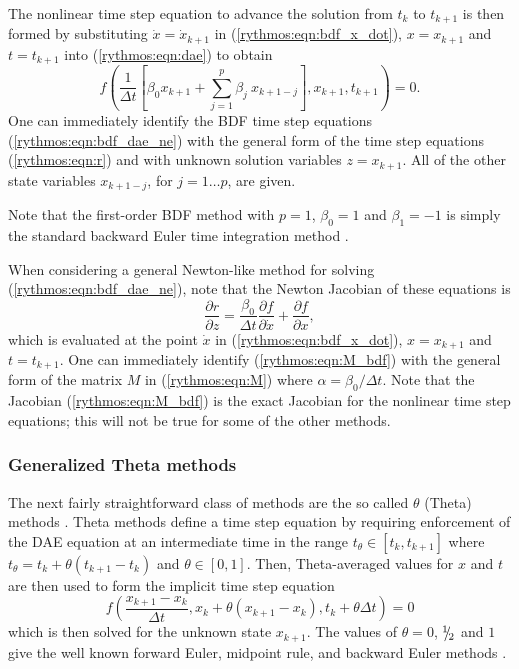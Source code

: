 \documentclass[pdf,ps2pdf,11pt]{SANDreport}
\begin{document}
The nonlinear time step equation to advance the solution from $t_k$ to
$t_{k+1}$ is then formed by substituting $\dot{x} = \dot{x}_{k+1}$ in
(\ref{rythmos:eqn:bdf_x_dot}), $x = x_{k+1}$ and $t = t_{k+1}$ into
(\ref{rythmos:eqn:dae}) to obtain
%
\begin{equation}
f\left( \frac{1}{\Delta t} \left[ \beta_0 x_{k+1} + \sum_{j=1}^{p} \beta_j \: x_{k+1-j} \right],x_{k+1},t_{k+1}\right) = 0.
\label{rythmos:eqn:bdf_dae_ne}
\end{equation}
%
One can immediately identify the BDF time step equations
(\ref{rythmos:eqn:bdf_dae_ne}) with the general form of the time step
equations (\ref{rythmos:eqn:r}) and with unknown solution variables $z =
x_{k+1}$.  All of the other state variables $x_{k+1-j}$, for $j = 1 {}\ldots
p$, are given.

Note that the first-order BDF method with $p=1$, $\beta_0 = 1$ and $\beta_1 =
-1$ is simply the standard backward Euler time integration method \cite{AscherPetzold}.

When considering a general Newton-like method for solving
(\ref{rythmos:eqn:bdf_dae_ne}), note that the Newton Jacobian of these
equations is
%
\begin{equation}
\frac{\partial r}{\partial z}
= \frac{\beta_0}{\Delta t} \frac{\partial f}{\partial \dot{x}} + \frac{\partial f}{\partial x},
\label{rythmos:eqn:M_bdf}
\end{equation}
%
which is evaluated at the point $\dot{x}$ in (\ref{rythmos:eqn:bdf_x_dot}), $x
= x_{k+1}$ and $t = t_{k+1}$.  One can immediately identify
(\ref{rythmos:eqn:M_bdf}) with the general form of the matrix $M$ in
(\ref{rythmos:eqn:M}) where $\alpha = \beta_0 / \Delta t$.  Note that the
Jacobian (\ref{rythmos:eqn:M_bdf}) is the exact Jacobian for the nonlinear
time step equations; this will not be true for some of the other methods.

\subsubsection{Generalized Theta methods}

The next fairly straightforward class of methods are the so called $\theta$
(Theta) methods \cite{HairerWanner}.  Theta methods define a time step equation by requiring
enforcement of the DAE equation at an intermediate time in the range
$t_{\theta} {}\in [t_k,t_{k+1}]$ where $t_{\theta} = t_k + \theta ( t_{k+1} -
t_k )$ and $\theta {}\in [0,1]$.  Then, Theta-averaged values for $x$ and $t$
are then used to form the implicit time step equation
%
\begin{equation}
f\left( \frac{x_{k+1} - x_{k}}{\Delta t},x_k + \theta ( x_{k+1} - x_{k} ), t_k + \theta \Delta t \right) = 0
\label{rythmos:eqn:theta_dae_ne}
\end{equation}
%
which is then solved for the unknown state $x_{k+1}$.  The values of $\theta =
0$, ${}^1 \!\! / \! {}_2$ and $1$ give the well known forward Euler, midpoint
rule, and backward Euler methods \cite{HairerWanner}.
\end{document}
